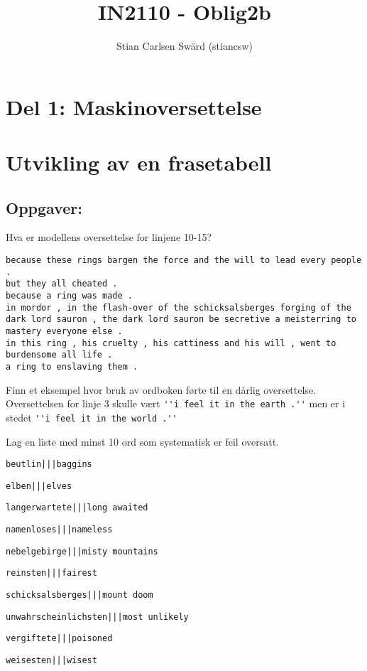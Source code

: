 \documentclass{article}
\author{Stian Carlsen Swärd (stiancsw)}
\title{IN2110 - Oblig2b}
\begin{document}
\maketitle

\section*{Del 1: Maskinoversettelse}
\section{Utvikling av en frasetabell}
\subsection*{Oppgaver:}
\begin{outline}[enumerate]
\1 Hva er modellens oversettelse for linjene 10-15?
\begin{verbatim}
because these rings bargen the force and the will to lead every people .
but they all cheated .
because a ring was made .
in mordor , in the flash-over of the schicksalsberges forging of the dark lord sauron , the dark lord sauron be secretive a meisterring to mastery everyone else .
in this ring , his cruelty , his cattiness and his will , went to burdensome all life .
a ring to enslaving them .
\end{verbatim}

\1 Finn et eksempel hvor bruk av ordboken førte til en dårlig oversettelse.
Oversettelsen for linje 3 skulle vært \verb|''i feel it in the earth .''| men er i stedet \verb|''i feel it in the world .''|

\1 Lag en liste med minst 10 ord som systematisk er feil oversatt.
    \2 \begin{verbatim}beutlin|||baggins\end{verbatim}
    \2 \begin{verbatim}elben|||elves\end{verbatim}
    \2 \begin{verbatim}langerwartete|||long awaited\end{verbatim}
    \2 \begin{verbatim}namenloses|||nameless\end{verbatim}
    \2 \begin{verbatim}nebelgebirge|||misty mountains\end{verbatim}
    \2 \begin{verbatim}reinsten|||fairest\end{verbatim}
    \2 \begin{verbatim}schicksalsberges|||mount doom\end{verbatim}
    \2 \begin{verbatim}unwahrscheinlichsten|||most unlikely\end{verbatim}
    \2 \begin{verbatim}vergiftete|||poisoned\end{verbatim}
    \2 \begin{verbatim}weisesten|||wisest\end{verbatim}
\end{outline}
\end{document}
